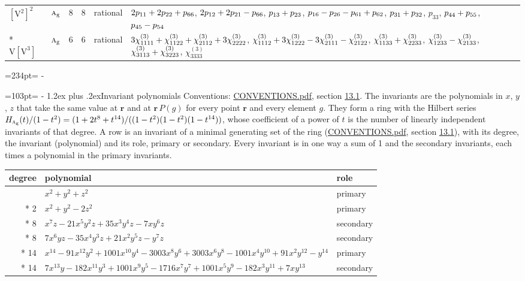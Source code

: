 \documentclass[10pt,a4paper]{article}
\makeatletter
\renewcommand\section{\@startsection{section}{1}{\z@}{-3ex plus -1ex minus -.2ex}%
  {1.2ex plus .2ex}{\normalfont\large\sffamily\bfseries\color{parttitle}}}
\newcommand{\needspace}[1]{\par\penalty-100\begingroup\dimen0=#1\relax\dimen2=\pagegoal
  \advance\dimen2-\pagetotal\ifdim\dimen0>\dimen2\relax\ifdim\dimen2>0pt\vfil\break\fi\fi
  \endgroup}
\numberwithin{equation}{section}
\newcommand{\irr}[1]{\text{\normalfont\scshape #1}}
\newcommand{\ptag}[1]{\mathrm{#1}}
\newcommand{\pointr}{\mathbf{r}}
\newcommand{\jahn}[1]{\mathrm{#1}}
\newlength{\fillwidth}\newlength{\cellwidth}\newlength{\colwidth}
\newcommand{\signbreak}{\penalty100\relax}
\makeatother
\begin{document}
{\begin{longtable}{@{}llrrl>{\RaggedRight\arraybackslash}p{\fillwidth}@{}}
$\jahn{[V^{2}]^{2}}$ & $\irr{a}_{\ptag{g}}$ & 8 & 8 & rational & $2p_{11} +\signbreak 2p_{22} +\signbreak p_{66}$, $2p_{12} +\signbreak 2p_{21} -\signbreak p_{66}$, $p_{13} +\signbreak p_{23}$, $p_{16} -\signbreak p_{26} -\signbreak p_{61} +\signbreak p_{62}$, $p_{31} +\signbreak p_{32}$, $p_{33}$, $p_{44} +\signbreak p_{55}$, $p_{45} -\signbreak p_{54}$\\*
$\jahn{V[V^{3}]}$ & $\irr{a}_{\ptag{g}}$ & 6 & 6 & rational & $3\chi^{(3)}_{1111} +\signbreak \chi^{(3)}_{1122} +\signbreak \chi^{(3)}_{2112} +\signbreak 3\chi^{(3)}_{2222}$, $\chi^{(3)}_{1112} +\signbreak 3\chi^{(3)}_{1222} -\signbreak 3\chi^{(3)}_{2111} -\signbreak \chi^{(3)}_{2122}$, $\chi^{(3)}_{1133} +\signbreak \chi^{(3)}_{2233}$, $\chi^{(3)}_{1233} -\signbreak \chi^{(3)}_{2133}$, $\chi^{(3)}_{3113} +\signbreak \chi^{(3)}_{3223}$, $\chi^{(3)}_{3333}$\\
\bottomrule\end{longtable}}
\needspace{234pt}
\needspace{103pt}
\section{Invariant polynomials}\label{s:invariant_polynomials}
Conventions: \href{../../CONVENTIONS.pdf}{CONVENTIONS.pdf}, section \href{../../CONVENTIONS.pdf\#conv.13.1}{13.1}.
The invariants are the polynomials in $x$, $y$, $z$ that take the same value at $\pointr$ and at $\pointr\,P(g)$ for every point $\pointr$ and every element $g$. They form a ring with the Hilbert series $H_{\irr{a}_{\ptag{g}}}(t)/(1-t^{2}) = (1 + 2t^{8} + t^{14})/((1-t^{2})(1-t^{2})(1-t^{14}))$, whose coefficient of a power of $t$ is the number of linearly independent invariants of that degree. \label{n:head.degree}\label{n:head.role}A row is an invariant of a minimal generating set of the ring (\href{../../CONVENTIONS.pdf}{CONVENTIONS.pdf}, section \href{../../CONVENTIONS.pdf\#conv.13.1}{13.1}), with its degree, the invariant (polynomial) and its role, primary or secondary. Every invariant is in one way a sum of 1 and the secondary invariants, each times a polynomial in the primary invariants.
{\small\begin{longtable}{@{}rll@{}}\toprule
degree & polynomial & role\\\midrule\endhead
\bottomrule\endfoot\endlastfoot
2 & $x^{2} + y^{2} + z^{2}$ & primary\\*
2 & $x^{2} + y^{2} - 2z^{2}$ & primary\\*
8 & $x^{7}z - 21x^{5}y^{2}z + 35x^{3}y^{4}z - 7xy^{6}z$ & secondary\\*
8 & $7x^{6}yz - 35x^{4}y^{3}z + 21x^{2}y^{5}z - y^{7}z$ & secondary\\*
14 & $x^{14} - 91x^{12}y^{2} + 1001x^{10}y^{4} - 3003x^{8}y^{6} + 3003x^{6}y^{8} - 1001x^{4}y^{10} + 91x^{2}y^{12} - y^{14}$ & primary\\*
14 & $7x^{13}y - 182x^{11}y^{3} + 1001x^{9}y^{5} - 1716x^{7}y^{7} + 1001x^{5}y^{9} - 182x^{3}y^{11} + 7xy^{13}$ & secondary\\
\bottomrule\end{longtable}}
\end{document}
